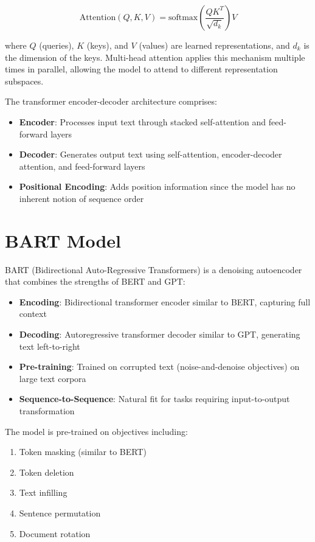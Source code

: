 \documentclass[12pt,a4paper,oneside]{report}
\begin{document}
\begin{equation}
\text{Attention}(Q, K, V) = \text{softmax}\left(\frac{QK^T}{\sqrt{d_k}}\right)V
\end{equation}

where $Q$ (queries), $K$ (keys), and $V$ (values) are learned representations, and $d_k$ is the dimension of the keys. Multi-head attention applies this mechanism multiple times in parallel, allowing the model to attend to different representation subspaces.

The transformer encoder-decoder architecture comprises:
\begin{itemize}
    \item \textbf{Encoder}: Processes input text through stacked self-attention and feed-forward layers
    \item \textbf{Decoder}: Generates output text using self-attention, encoder-decoder attention, and feed-forward layers
    \item \textbf{Positional Encoding}: Adds position information since the model has no inherent notion of sequence order
\end{itemize}

\section{BART Model}
BART (Bidirectional Auto-Regressive Transformers) is a denoising autoencoder that combines the strengths of BERT and GPT:
\begin{itemize}
    \item \textbf{Encoding}: Bidirectional transformer encoder similar to BERT, capturing full context
    \item \textbf{Decoding}: Autoregressive transformer decoder similar to GPT, generating text left-to-right
    \item \textbf{Pre-training}: Trained on corrupted text (noise-and-denoise objectives) on large text corpora
    \item \textbf{Sequence-to-Sequence}: Natural fit for tasks requiring input-to-output transformation
\end{itemize}

The model is pre-trained on objectives including:
\begin{enumerate}
    \item Token masking (similar to BERT)
    \item Token deletion
    \item Text infilling
    \item Sentence permutation
    \item Document rotation
\end{enumerate}
\end{document}
